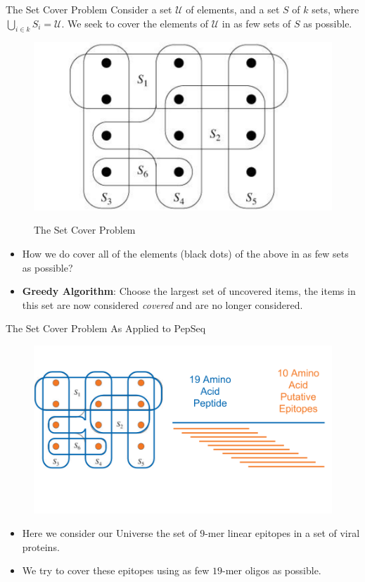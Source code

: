 \documentclass[final]{beamer}
\newlength{\colwidth}
\begin{document}
\begin{frame}[t]
\begin{columns}[t]
\begin{column}{\colwidth}
\begin{block}{The Set Cover Problem}
  Consider a set $\mathcal{U}$ of elements, and a set $S$ of $k$ sets, where
  $\bigcup_{i \in k}S_i = \mathcal{U}$. We seek to cover the elements of $\mathcal{U}$ in as few
  sets of $S$ as possible.
    \begin{figure}
      \includegraphics[width=0.6\colwidth]{figures/set_cover.png}
      \label{fig:library}
      \caption{The Set Cover Problem}
    \end{figure}
    \begin{itemize}
      \item How we do cover all of the elements (black dots) of the above in as few sets as possible?
      \item \textbf{Greedy Algorithm}: Choose the largest set of uncovered items, the items in this set are now considered \emph{covered} and are no longer considered.
    \end{itemize}
\end{block}

\begin{block}{The Set Cover Problem As Applied to PepSeq}
    \begin{figure}
      \includegraphics[width=0.6\colwidth]{figures/set_cover_oligo.png}
      \label{fig:library}
    \end{figure}
    \begin{itemize}
      \item Here we consider our Universe the set of $9$-mer linear epitopes in a set of viral proteins.
      \item We try to cover these epitopes using as few $19$-mer oligos as possible.
    \end{itemize}



\end{block}
\end{column}
\end{columns}
\end{frame}
\end{document}
